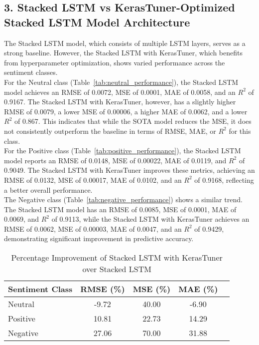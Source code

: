 \documentclass[letterpaper]{article}
\begin{document}
\subsection{3. Stacked LSTM vs KerasTuner-Optimized Stacked LSTM Model Architecture}
The Stacked LSTM model, which consists of multiple LSTM layers, serves as a strong baseline. However, the Stacked LSTM with KerasTuner, which benefits from hyperparameter optimization, shows varied performance across the sentiment classes.\\

For the Neutral class (Table~\ref{tab:neutral_performance}), the Stacked LSTM model achieves an RMSE of 0.0072, MSE of 0.0001, MAE of 0.0058, and an $R^2$ of 0.9167. The Stacked LSTM with KerasTuner, however, has a slightly higher RMSE of 0.0079, a lower MSE of 0.00006, a higher MAE of 0.0062, and a lower $R^2$ of 0.867. This indicates that while the SOTA model reduces the MSE, it does not consistently outperform the baseline in terms of RMSE, MAE, or $R^2$ for this class.\\

For the Positive class (Table~\ref{tab:positive_performance}), the Stacked LSTM model reports an RMSE of 0.0148, MSE of 0.00022, MAE of 0.0119, and $R^2$ of 0.9049. The Stacked LSTM with KerasTuner improves these metrics, achieving an RMSE of 0.0132, MSE of 0.00017, MAE of 0.0102, and an $R^2$ of 0.9168, reflecting a better overall performance.\\

The Negative class (Table~\ref{tab:negative_performance}) shows a similar trend. The Stacked LSTM model has an RMSE of 0.0085, MSE of 0.0001, MAE of 0.0069, and $R^2$ of 0.9113, while the Stacked LSTM with KerasTuner achieves an RMSE of 0.0062, MSE of 0.00003, MAE of 0.0047, and an $R^2$ of 0.9429, demonstrating significant improvement in predictive accuracy.

\begin{table}[h]
\centering
\caption{Percentage Improvement of Stacked LSTM with KerasTuner over Stacked LSTM}
\label{tab:improvement_metrics_stacked_lstm}
\begin{tabular}{lcccc}
\toprule
\textbf{Sentiment Class} & \textbf{RMSE (\%)} & \textbf{MSE (\%)} & \textbf{MAE (\%)} \\
\midrule
Neutral & -9.72 & 40.00 & -6.90  \\
Positive & 10.81 & 22.73 & 14.29 \\
Negative & 27.06 & 70.00 & 31.88 \\
\bottomrule
\end{tabular}
\end{table}
\end{document}
